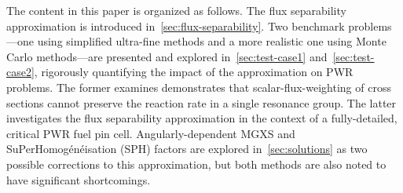 The content in this paper is organized as follows. The flux separability approximation is introduced in~\autoref{sec:flux-separability}.  Two benchmark problems---one using simplified ultra-fine methods and a more realistic one using Monte Carlo methods---are presented and explored in~\autoref{sec:test-case1} and~\autoref{sec:test-case2}, rigorously quantifying the impact of the approximation on PWR problems.  The former examines demonstrates that scalar-flux-weighting of cross sections cannot preserve the reaction rate in a single resonance group.  The latter investigates the flux separability approximation in the context of a fully-detailed, critical PWR fuel pin cell.  Angularly-dependent MGXS and SuPerHomog\'{e}n\'{e}isation (SPH) factors are explored in~\autoref{sec:solutions} as two possible corrections to this approximation, but both methods are also noted to have significant shortcomings.
